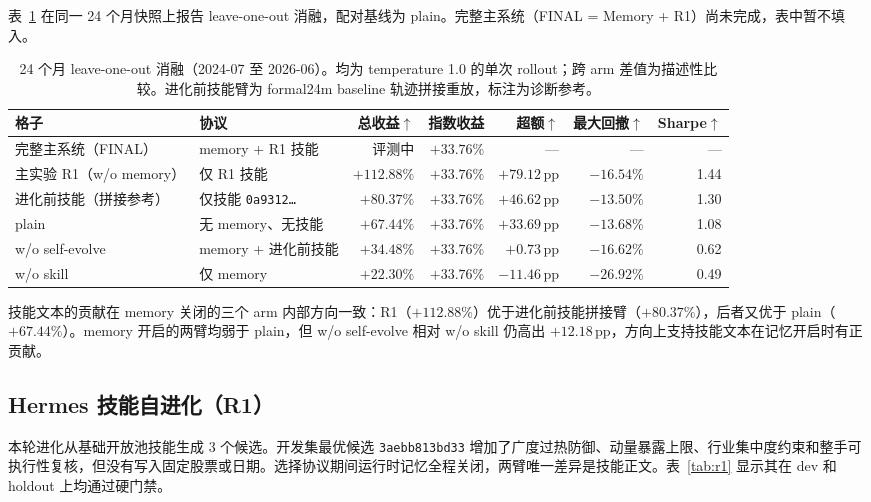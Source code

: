\documentclass[11pt]{article}
\newcommand{\pp}{\,\mathrm{pp}}
\begin{document}
表~\ref{tab:ablation-matrix} 在同一 24 个月快照上报告 leave-one-out 消融，配对基线为 plain。完整主系统（FINAL = Memory + R1）尚未完成，表中暂不填入。

\begin{table}[!t]
\centering
\caption{24 个月 leave-one-out 消融（2024-07 至 2026-06）。均为 temperature 1.0 的单次 rollout；跨 arm 差值为描述性比较。进化前技能臂为 formal24m baseline 轨迹拼接重放，标注为诊断参考。}
\label{tab:ablation-matrix}
\small
\begin{tabular}{@{}llrrrrr@{}}
\toprule
\textbf{格子} & \textbf{协议} & \textbf{总收益}$\uparrow$ & \textbf{指数收益} &
\textbf{超额}$\uparrow$ & \textbf{最大回撤}$\uparrow$ & \textbf{Sharpe}$\uparrow$ \\
\midrule
完整主系统（FINAL） & memory + R1 技能 & 评测中 & $+33.76\%$ & --- & --- & --- \\
主实验 R1（w/o memory） & 仅 R1 技能 & $+112.88\%$ & $+33.76\%$ & $+79.12\pp$ & $-16.54\%$ & 1.44 \\
进化前技能（拼接参考） & 仅技能 \texttt{0a9312\ldots} & $+80.37\%$ & $+33.76\%$ & $+46.62\pp$ & $-13.50\%$ & 1.30 \\
plain & 无 memory、无技能 & $+67.44\%$ & $+33.76\%$ & $+33.69\pp$ & $-13.68\%$ & 1.08 \\
w/o self-evolve & memory + 进化前技能 & $+34.48\%$ & $+33.76\%$ & $+0.73\pp$ & $-16.62\%$ & 0.62 \\
w/o skill & 仅 memory & $+22.30\%$ & $+33.76\%$ & $-11.46\pp$ & $-26.92\%$ & 0.49 \\
\bottomrule
\end{tabular}
\end{table}

技能文本的贡献在 memory 关闭的三个 arm 内部方向一致：R1（$+112.88\%$）优于进化前技能拼接臂（$+80.37\%$），后者又优于 plain（$+67.44\%$）。memory 开启的两臂均弱于 plain，但 w/o self-evolve 相对 w/o skill 仍高出 $+12.18\pp$，方向上支持技能文本在记忆开启时有正贡献。

\subsection{Hermes 技能自进化（R1）}
\label{sec:r1}

本轮进化从基础开放池技能生成 3 个候选。开发集最优候选 \texttt{3aebb813bd33} 增加了广度过热防御、动量暴露上限、行业集中度约束和整手可执行性复核，但没有写入固定股票或日期。选择协议期间运行时记忆全程关闭，两臂唯一差异是技能正文。表~\ref{tab:r1} 显示其在 dev 和 holdout 上均通过硬门禁。
\end{document}
